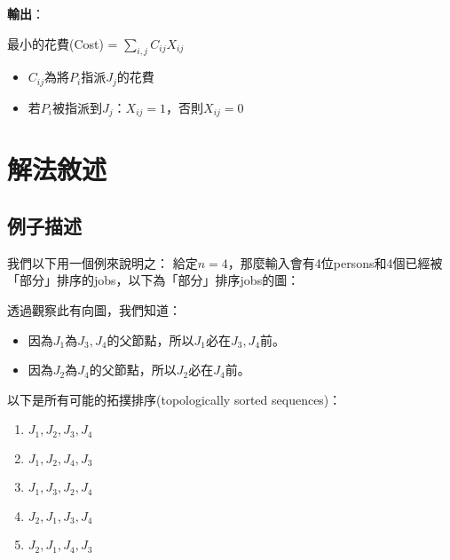 \documentclass[15pt]{extarticle}
\begin{document}
\vskip3mm
\textbf{輸出}：
\begin{minipage}[t]{0.8\linewidth}
    最小的花費(Cost) = $\sum\limits_{i,j}C_{ij}X_{ij}$
    \begin{itemize}
        \item $C_{ij}$為將$P_i$指派$J_j$的花費
        \item 若$P_i$被指派到$J_j$：$X_{ij}=1$，否則$X_{ij}=0$
    \end{itemize}
\end{minipage}

\section{解法敘述}
\subsection{例子描述}
我們以下用一個例來說明之：
給定$n=4$，那麼輸入會有4位persons和4個已經被「部分」排序的jobs，以下為「部分」排序jobs的圖：

\begin{center}
\end{center}

透過觀察此有向圖，我們知道：
\begin{itemize}
    \item 因為$J_1$為$J_3,J_4$的父節點，所以$J_1$必在$J_3,J_4$前。 
    \item 因為$J_2$為$J_4$的父節點，所以$J_2$必在$J_4$前。    
\end{itemize}

\newpage
以下是所有可能的拓撲排序(topologically sorted sequences)：
\begin{enumerate}
    \item $J_1,J_2,J_3,J_4$
    \item $J_1,J_2,J_4,J_3$
    \item $J_1,J_3,J_2,J_4$
    \item $J_2,J_1,J_3,J_4$
    \item $J_2,J_1,J_4,J_3$
\end{enumerate}
\end{document}
